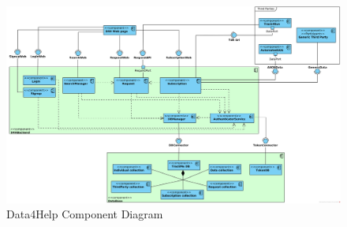 \documentclass[a4paper, hidelinks, 12pt]{report}
\begin{document}
			\begin{figure}
    				\centering
				\includegraphics[width=1\textwidth]{diagrams/d4h_component_diagram.png}
				\caption[Data4Help Component Diagram]{Data4Help Component Diagram}
				\label{fig:d4h_component_diagram}
			\end{figure}	
			\clearpage
			
\end{document}

